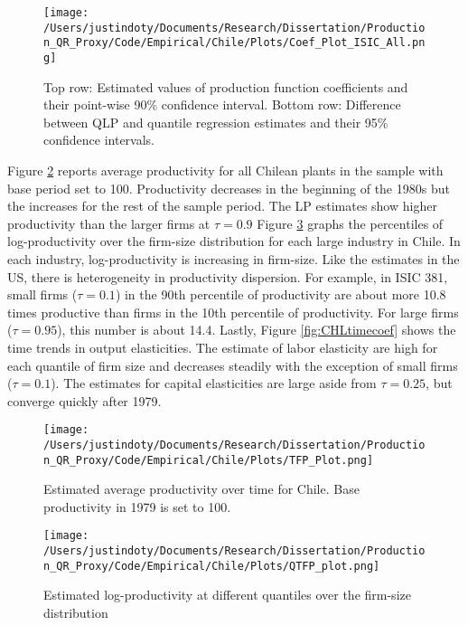\documentclass[11pt]{article}
\begin{document}
\begin{figure}[H]
\centering
\texttt{[image: /Users/justindoty/Documents/Research/Dissertation/Production\_QR\_Proxy/Code/Empirical/Chile/Plots/Coef\_Plot\_ISIC\_All.png]}
\caption{Top row: Estimated values of production function coefficients and their point-wise 90\% confidence interval. Bottom row: Difference between QLP and quantile regression estimates and their 95\% confidence intervals.}
\label{fig:CHLall}
\end{figure}



Figure \ref{fig:CHLpgrowth} reports average productivity for all Chilean plants in the sample with base period set to 100. Productivity decreases in the beginning of the 1980s but the increases for the rest of the sample period. The LP estimates show higher productivity than the larger firms at $\tau=0.9$ Figure \ref{fig:CHLpdisp} graphs the percentiles of log-productivity over the firm-size distribution for each large industry in Chile. In each industry, log-productivity is increasing in firm-size. Like the estimates in the US, there is heterogeneity in productivity dispersion. For example, in ISIC 381, small firms ($\tau=0.1$) in the 90th percentile of productivity are about more 10.8 times productive than firms in the 10th percentile of productivity. For large firms ($\tau=0.95$), this number is about 14.4. Lastly, Figure \ref{fig:CHLtimecoef} shows the time trends in output elasticities. The estimate of labor elasticity are high for each quantile of firm size and decreases steadily with the exception of small firms ($\tau=0.1$). The estimates for capital elasticities are large aside from $\tau=0.25$, but converge quickly after 1979. 

\begin{figure}[H]
\centering
\texttt{[image: /Users/justindoty/Documents/Research/Dissertation/Production\_QR\_Proxy/Code/Empirical/Chile/Plots/TFP\_Plot.png]}
\caption{Estimated average productivity over time for Chile. Base productivity in 1979 is set to 100.}
\label{fig:CHLpgrowth}
\end{figure}

\begin{figure}[H]
\centering
\texttt{[image: /Users/justindoty/Documents/Research/Dissertation/Production\_QR\_Proxy/Code/Empirical/Chile/Plots/QTFP\_plot.png]}
\caption{Estimated log-productivity at different quantiles over the firm-size distribution}
\label{fig:CHLpdisp}
\end{figure}
\end{document}
